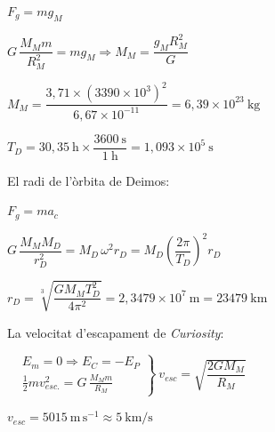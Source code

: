\begin{solapartat}
 $F_g = m g_M$

 $G\,\dfrac{M_M m}{R_M^2} = m g_M \Rightarrow M_M = \dfrac{g_M R_M^2}{G}$

 $M_M = \dfrac{3,71\times(3390\times 10^{3})^2}{6,67\times 10^{-11}} = 6,39\times 10^{23}\ \mathrm{kg}$
\end{solapartat}

\begin{solapartat}
 $T_D = 30,35\ \mathrm{h}\times\dfrac{3600\ \mathrm{s}}{1\ \mathrm{h}} = 1,093\times 10^{5}\ \mathrm{s}$

El radi de l'òrbita de Deimos:

 $F_g = m a_c$

 $G\,\dfrac{M_M M_D}{r_D^2} = M_D\,\omega^2 r_D = M_D\left(\dfrac{2\pi}{T_D}\right)^2 r_D$

 $r_D = \sqrt[3]{\dfrac{G M_M T_D^2}{4\pi^2}} = 2,3479\times 10^{7}\ \mathrm{m} = 23479\ \mathrm{km}$

La velocitat d'escapament de \textit{Curiosity}:

 $\left.\begin{aligned} &E_m = 0 \Rightarrow E_C = -E_P\\ &\frac{1}{2} m v_\mathit{esc.}^2 = G\,\frac{M_M m}{R_M}\end{aligned}\right\}\ v_\mathit{esc} = \sqrt{\dfrac{2 G M_M}{R_M}}$

 $v_\mathit{esc} = 5015\ \mathrm{m\,s^{-1}} \approx 5\ \mathrm{km/s}$
\end{solapartat}
